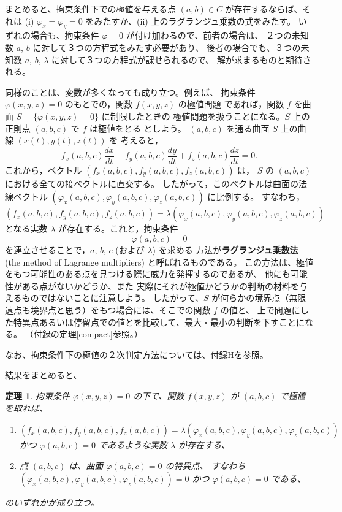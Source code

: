 \documentclass[a4paper]{jsarticle}
\newtheorem{Theorem}{定理}[section]
\theoremstyle{definition}
\theoremstyle{remark}
\begin{document}
まとめると、拘束条件下での極値を与える点 $(a,b) \in C$ が存在するならば、それは
(i) $\varphi_x = \varphi_y = 0$ をみたすか、(ii) 上のラグランジュ乗数の式をみたす。
いずれの場合も、拘束条件 $\varphi = 0$ が付け加わるので、前者の場合は、
２つの未知数 $a$, $b$ に対して３つの方程式をみたす必要があり、
後者の場合でも、３つの未知数 $a$, $b$, $\lambda$ に対して３つの方程式が課せられるので、
解が求まるものと期待される。

同様のことは、変数が多くなっても成り立つ。例えば、
拘束条件 $\varphi(x,y,z) = 0$ のもとでの，関数 $f(x,y,z)$ の極値問題
であれば，関数 $f$ を曲面 $S = \{ \varphi(x,y,z) = 0\}$ に制限したときの
極値問題を扱うことになる。$S$ 上の正則点 $(a,b,c)$ で $f$ は極値をとる
としよう。
$(a,b,c)$ を通る曲面 $S$ 上の曲線 $(x(t),y(t),z(t))$ を
考えると，
\[
f_x(a,b,c)\frac{dx}{dt} + f_y(a,b,c)\frac{dy}{dt} 
+ f_z(a,b,c)\frac{dz}{dt} = 0.
\]
これから，ベクトル $(f_x(a,b,c), f_y(a,b,c), f_z(a,b,c))$ は，
$S$ の $(a,b,c)$ における全ての接ベクトルに直交する。
したがって，このベクトルは曲面の法線ベクトル
$(\varphi_x(a,b,c), \varphi_y(a,b,c), \varphi_z(a,b,c))$ に比例する。
すなわち，
\[
(f_x(a,b,c),f_y(a,b,c),f_z(a,b,c)) = \lambda 
(\varphi_x(a,b,c), \varphi_y(a,b,c), \varphi_z(a,b,c))
\]
となる実数 $\lambda$ が存在する。これと，拘束条件
\[
\varphi(a,b,c) = 0
\]
を連立させることで，$a$, $b$, $c$ (および $\lambda$) を求める
方法が\textbf{ラグランジュ乗数法} (the method of Lagrange multipliers) と呼ばれるものである。
この方法は、極値をもつ可能性のある点を見つける際に威力を発揮するのであるが、
他にも可能性がある点がないかどうか、また
実際にそれが極値かどうかの判断の材料を与えるものではないことに注意しよう。
したがって、$S$ が何らかの境界点（無限遠点も境界点と思う）をもつ場合には、そこでの関数 $f$ の値と、
上で問題にした特異点あるいは停留点での値とを比較して、最大・最小の判断を下すことになる。
（付録の定理\ref{compact}参照。）

なお、拘束条件下の極値の２次判定方法については、付録Hを参照。

結果をまとめると、

\begin{Theorem} 
拘束条件 $\varphi(x,y,z) = 0$ の下で、関数 $f(x,y,z)$ が $(a,b,c)$ で極値を取れば、
\begin{enumerate}
\item 
$(f_x(a,b,c), f_y(a,b,c), f_z(a,b,c)) = \lambda (\varphi_x(a,b,c), \varphi_y(a,b,c), \varphi_z(a,b,c))$ 
かつ $\varphi(a,b,c) = 0$ であるような実数 $\lambda$ が存在する、
\item 
点 $(a,b,c)$ は、曲面 $\varphi(a,b,c) = 0$ の特異点、
すなわち $(\varphi_x(a,b,c), \varphi_y(a,b,c), \varphi_z(a,b,c)) = 0$ かつ $\varphi(a,b,c) = 0$ である、
\end{enumerate}
のいずれかが成り立つ。
\end{Theorem} 
\end{document}
